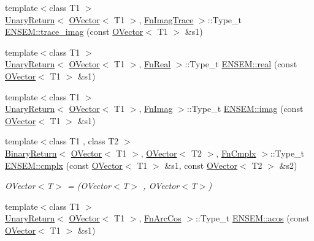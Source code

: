 \begin{DoxyCompactItemize}
\item 
{\footnotesize template$<$class T1 $>$ }\\\mbox{\hyperlink{structENSEM_1_1UnaryReturn}{Unary\+Return}}$<$ \mbox{\hyperlink{classENSEM_1_1OVector}{O\+Vector}}$<$ T1 $>$, \mbox{\hyperlink{structENSEM_1_1FnImagTrace}{Fn\+Imag\+Trace}} $>$\+::Type\+\_\+t \mbox{\hyperlink{group__obsvector_ga42b95d27dd97c7484c4ddcc401aa305f}{E\+N\+S\+E\+M\+::trace\+\_\+imag}} (const \mbox{\hyperlink{classENSEM_1_1OVector}{O\+Vector}}$<$ T1 $>$ \&s1)
\item 
{\footnotesize template$<$class T1 $>$ }\\\mbox{\hyperlink{structENSEM_1_1UnaryReturn}{Unary\+Return}}$<$ \mbox{\hyperlink{classENSEM_1_1OVector}{O\+Vector}}$<$ T1 $>$, \mbox{\hyperlink{structENSEM_1_1FnReal}{Fn\+Real}} $>$\+::Type\+\_\+t \mbox{\hyperlink{group__obsvector_ga655235d17cdd06edc03c39a79f110d59}{E\+N\+S\+E\+M\+::real}} (const \mbox{\hyperlink{classENSEM_1_1OVector}{O\+Vector}}$<$ T1 $>$ \&s1)
\item 
{\footnotesize template$<$class T1 $>$ }\\\mbox{\hyperlink{structENSEM_1_1UnaryReturn}{Unary\+Return}}$<$ \mbox{\hyperlink{classENSEM_1_1OVector}{O\+Vector}}$<$ T1 $>$, \mbox{\hyperlink{structENSEM_1_1FnImag}{Fn\+Imag}} $>$\+::Type\+\_\+t \mbox{\hyperlink{group__obsvector_gaf1cbe27c6155721a04405dcecb528d53}{E\+N\+S\+E\+M\+::imag}} (const \mbox{\hyperlink{classENSEM_1_1OVector}{O\+Vector}}$<$ T1 $>$ \&s1)
\item 
{\footnotesize template$<$class T1 , class T2 $>$ }\\\mbox{\hyperlink{structENSEM_1_1BinaryReturn}{Binary\+Return}}$<$ \mbox{\hyperlink{classENSEM_1_1OVector}{O\+Vector}}$<$ T1 $>$, \mbox{\hyperlink{classENSEM_1_1OVector}{O\+Vector}}$<$ T2 $>$, \mbox{\hyperlink{structENSEM_1_1FnCmplx}{Fn\+Cmplx}} $>$\+::Type\+\_\+t \mbox{\hyperlink{group__obsvector_ga363734253f08749647255a90c647284c}{E\+N\+S\+E\+M\+::cmplx}} (const \mbox{\hyperlink{classENSEM_1_1OVector}{O\+Vector}}$<$ T1 $>$ \&s1, const \mbox{\hyperlink{classENSEM_1_1OVector}{O\+Vector}}$<$ T2 $>$ \&s2)
\begin{DoxyCompactList}\small\item\em O\+Vector$<$\+T$>$ = (O\+Vector$<$\+T$>$ , O\+Vector$<$\+T$>$) \end{DoxyCompactList}\item 
{\footnotesize template$<$class T1 $>$ }\\\mbox{\hyperlink{structENSEM_1_1UnaryReturn}{Unary\+Return}}$<$ \mbox{\hyperlink{classENSEM_1_1OVector}{O\+Vector}}$<$ T1 $>$, \mbox{\hyperlink{structENSEM_1_1FnArcCos}{Fn\+Arc\+Cos}} $>$\+::Type\+\_\+t \mbox{\hyperlink{group__obsvector_ga3b0e5ce4d5c52455bce825cd795a0363}{E\+N\+S\+E\+M\+::acos}} (const \mbox{\hyperlink{classENSEM_1_1OVector}{O\+Vector}}$<$ T1 $>$ \&s1)

\end{DoxyCompactItemize}
